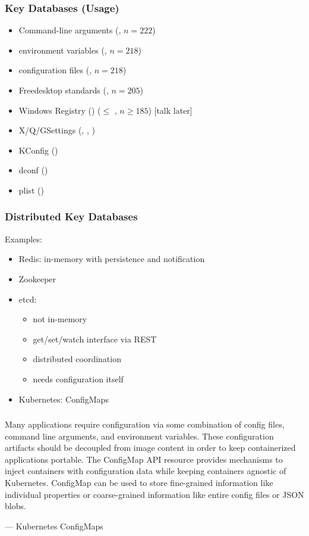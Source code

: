 \begin{frame}
	\frametitle{Key Databases (Usage)}

	\methodQuestion{} 

	\begin{itemize}
	\item Command-line arguments (, $n=222$)
	\item environment variables (, $n=218$)
	\item configuration files (, $n=218$)
	\item Freedesktop standards (, $n=205$)
	\item Windows Registry () ($\leq$ , $n\geq185$) [talk later]
	\item X/Q/GSettings (, , )
	\item KConfig ()
	\item dconf ()
	\item plist ()
	\end{itemize}

\end{frame}

\begin{frame}
	\frametitle{Distributed Key Databases}

	Examples:

	\begin{itemize}
	\item Redis: in-memory with persistence and notification
	\item Zookeeper
	\item etcd:
		\begin{itemize}
		\item not in-memory
		\item get/set/watch interface via REST
		\item distributed coordination~\cite{ongaro2014search}
		\item needs configuration itself
		\end{itemize}
	\item Kubernetes: ConfigMaps
	\end{itemize}
\end{frame}

\begin{frame}
	\frametitle{}
	Many applications require configuration via some combination of config files, command line arguments, and environment variables. These configuration artifacts should be decoupled from image content in order to keep containerized applications portable. The ConfigMap API resource provides mechanisms to inject containers with configuration data while keeping containers agnostic of Kubernetes. ConfigMap can be used to store fine-grained information like individual properties or coarse-grained information like entire config files or JSON blobs.
	\par\raggedleft--- \textup{Kubernetes ConfigMaps}
\end{frame}

